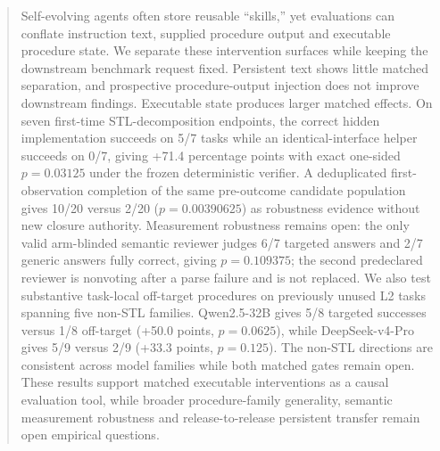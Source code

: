 \begin{abstract}
Self-evolving agents often store reusable ``skills,'' yet evaluations can conflate instruction text, supplied procedure output and executable procedure state. We separate these intervention surfaces while keeping the downstream benchmark request fixed. Persistent text shows little matched separation, and prospective procedure-output injection does not improve downstream findings. Executable state produces larger matched effects. On seven first-time STL-decomposition endpoints, the correct hidden implementation succeeds on 5/7 tasks while an identical-interface helper succeeds on 0/7, giving +71.4 percentage points with exact one-sided $p=0.03125$ under the frozen deterministic verifier. A deduplicated first-observation completion of the same pre-outcome candidate population gives 10/20 versus 2/20 ($p=0.00390625$) as robustness evidence without new closure authority. Measurement robustness remains open: the only valid arm-blinded semantic reviewer judges 6/7 targeted answers and 2/7 generic answers fully correct, giving $p=0.109375$; the second predeclared reviewer is nonvoting after a parse failure and is not replaced. We also test substantive task-local off-target procedures on previously unused L2 tasks spanning five non-STL families. Qwen2.5-32B gives 5/8 targeted successes versus 1/8 off-target (+50.0 points, $p=0.0625$), while DeepSeek-v4-Pro gives 5/9 versus 2/9 (+33.3 points, $p=0.125$). The non-STL directions are consistent across model families while both matched gates remain open. These results support matched executable interventions as a causal evaluation tool, while broader procedure-family generality, semantic measurement robustness and release-to-release persistent transfer remain open empirical questions.
\end{abstract}
